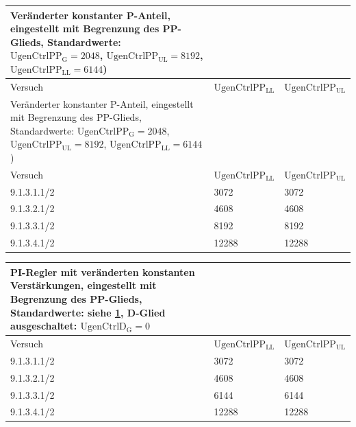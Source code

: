 \begin{longtable}[]{lll}
    \caption{Veränderter konstanter P-Anteil, eingestellt mit Begrenzung des PP-Glieds,\\Standardwerte: $\mathrm{UgenCtrlPP_G}=2048$, $\mathrm{UgenCtrlPP_{UL}}=8192$, $\mathrm{UgenCtrlPP_{LL}}=6144$)}
    \label{tab:Parameter-P-Messung}
        \tabularnewline
    \toprule
    Versuch     & $\mathrm{UgenCtrlPP_{LL}}$ & $\mathrm{UgenCtrlPP_{UL}}$ \\
    \midrule
    \endfirsthead
    \caption{Veränderter konstanter P-Anteil, eingestellt mit Begrenzung des PP-Glieds,\\Standardwerte: $\mathrm{UgenCtrlPP_G}=2048$, $\mathrm{UgenCtrlPP_{UL}}=8192$, $\mathrm{UgenCtrlPP_{LL}}=6144$)}
    \tabularnewline
    \toprule
    Versuch     & $\mathrm{UgenCtrlPP_{LL}}$ & $\mathrm{UgenCtrlPP_{UL}}$ \\
    \midrule
    \endhead
        9.1.3.1.1/2 & 3072         & 3072  \\
        9.1.3.2.1/2 & 4608         & 4608  \\
        9.1.3.3.1/2 & 8192         & 8192  \\
        9.1.3.4.1/2 & 12288        & 12288 \\
    \bottomrule
\end{longtable}

\begin{longtable}[]{lll}
    \caption{PI-Regler mit veränderten konstanten Verstärkungen, eingestellt mit Begrenzung des PP-Glieds,\\Standardwerte: siehe \cref{tab:Parameter-P-Messung},\\D-Glied ausgeschaltet: $\mathrm{UgenCtrlD_G=0}$}
    \label{tab:Parameter-PI-Messung}
    \tabularnewline
    \toprule
    Versuch     & $\mathrm{UgenCtrlPP_{LL}}$ & $\mathrm{UgenCtrlPP_{UL}}$ \\
    \midrule
    \endhead
        9.1.3.1.1/2 & 3072         & 3072  \\
        9.1.3.2.1/2 & 4608         & 4608  \\
        9.1.3.3.1/2 & 6144         & 6144  \\
        9.1.3.4.1/2 & 12288        & 12288 \\
    \bottomrule
\end{longtable}

